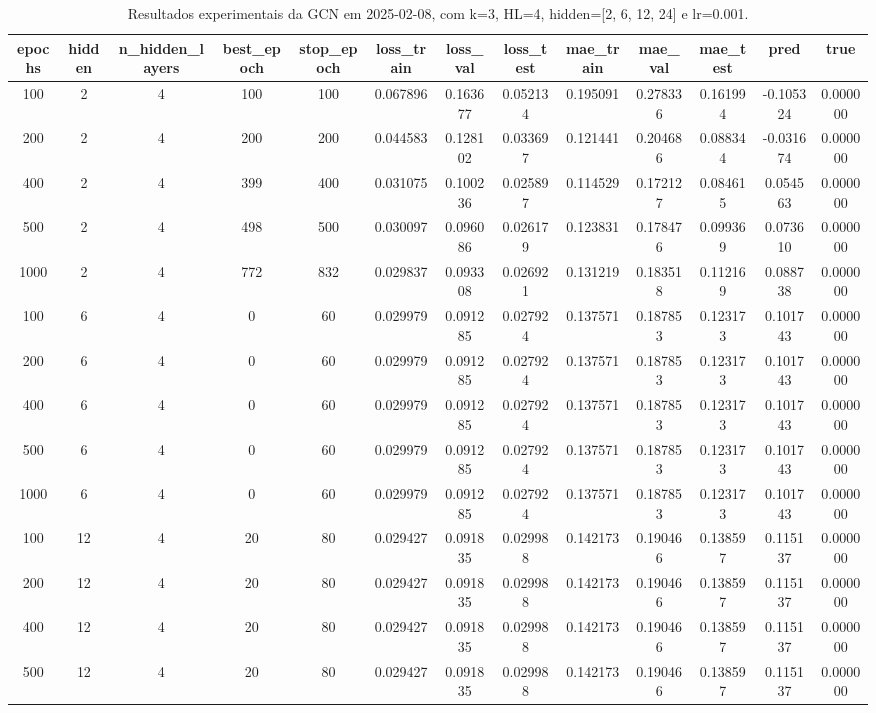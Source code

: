 \begin{table}[h]
\centering
\caption{Resultados experimentais da GCN em 2025-02-08, com k=3, HL=4, hidden=[2, 6, 12, 24] e lr=0.001.}
\label{tab:gcn_results_k3_hl4_d20250208}
\begin{tabular}{ccccccccccccc}
\toprule
epochs & hidden & n\_hidden\_layers & best\_epoch & stop\_epoch & loss\_train & loss\_val & loss\_test & mae\_train & mae\_val & mae\_test & pred & true \\
\midrule
100 & 2 & 4 & 100 & 100 & 0.067896 & 0.163677 & 0.052134 & 0.195091 & 0.278336 & 0.161994 & -0.105324 & 0.000000 \\
200 & 2 & 4 & 200 & 200 & 0.044583 & 0.128102 & 0.033697 & 0.121441 & 0.204686 & 0.088344 & -0.031674 & 0.000000 \\
400 & 2 & 4 & 399 & 400 & 0.031075 & 0.100236 & 0.025897 & 0.114529 & 0.172127 & 0.084615 & 0.054563 & 0.000000 \\
500 & 2 & 4 & 498 & 500 & 0.030097 & 0.096086 & 0.026179 & 0.123831 & 0.178476 & 0.099369 & 0.073610 & 0.000000 \\
1000 & 2 & 4 & 772 & 832 & 0.029837 & 0.093308 & 0.026921 & 0.131219 & 0.183518 & 0.112169 & 0.088738 & 0.000000 \\
100 & 6 & 4 & 0 & 60 & 0.029979 & 0.091285 & 0.027924 & 0.137571 & 0.187853 & 0.123173 & 0.101743 & 0.000000 \\
200 & 6 & 4 & 0 & 60 & 0.029979 & 0.091285 & 0.027924 & 0.137571 & 0.187853 & 0.123173 & 0.101743 & 0.000000 \\
400 & 6 & 4 & 0 & 60 & 0.029979 & 0.091285 & 0.027924 & 0.137571 & 0.187853 & 0.123173 & 0.101743 & 0.000000 \\
500 & 6 & 4 & 0 & 60 & 0.029979 & 0.091285 & 0.027924 & 0.137571 & 0.187853 & 0.123173 & 0.101743 & 0.000000 \\
1000 & 6 & 4 & 0 & 60 & 0.029979 & 0.091285 & 0.027924 & 0.137571 & 0.187853 & 0.123173 & 0.101743 & 0.000000 \\
100 & 12 & 4 & 20 & 80 & 0.029427 & 0.091835 & 0.029988 & 0.142173 & 0.190466 & 0.138597 & 0.115137 & 0.000000 \\
200 & 12 & 4 & 20 & 80 & 0.029427 & 0.091835 & 0.029988 & 0.142173 & 0.190466 & 0.138597 & 0.115137 & 0.000000 \\
400 & 12 & 4 & 20 & 80 & 0.029427 & 0.091835 & 0.029988 & 0.142173 & 0.190466 & 0.138597 & 0.115137 & 0.000000 \\
500 & 12 & 4 & 20 & 80 & 0.029427 & 0.091835 & 0.029988 & 0.142173 & 0.190466 & 0.138597 & 0.115137 & 0.000000 \\

\end{tabular}
\end{table}
